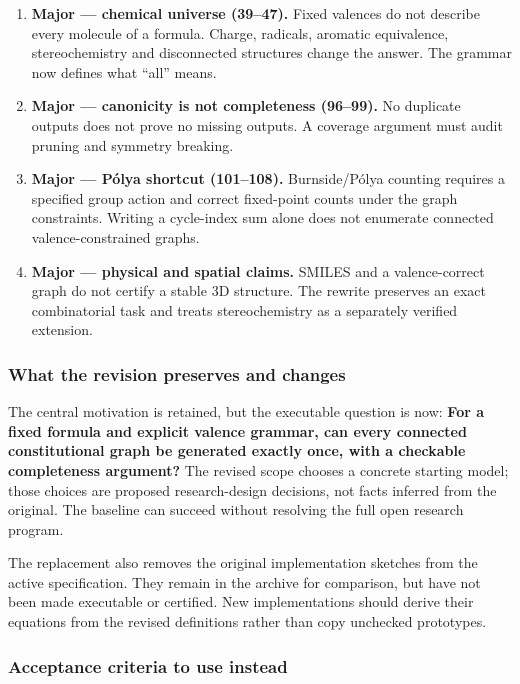 \documentclass[
  11pt,
]{article}
\begin{document}
\begin{enumerate}
\def\labelenumi{\arabic{enumi}.}
\item
  \textbf{Major --- chemical universe (39--47).} Fixed valences do not
  describe every molecule of a formula. Charge, radicals, aromatic
  equivalence, stereochemistry and disconnected structures change the
  answer. The grammar now defines what ``all'' means.
\item
  \textbf{Major --- canonicity is not completeness (96--99).} No
  duplicate outputs does not prove no missing outputs. A coverage
  argument must audit pruning and symmetry breaking.
\item
  \textbf{Major --- Pólya shortcut (101--108).} Burnside/Pólya counting
  requires a specified group action and correct fixed-point counts under
  the graph constraints. Writing a cycle-index sum alone does not
  enumerate connected valence-constrained graphs.
\item
  \textbf{Major --- physical and spatial claims.} SMILES and a
  valence-correct graph do not certify a stable 3D structure. The
  rewrite preserves an exact combinatorial task and treats
  stereochemistry as a separately verified extension.
\end{enumerate}

\subsubsection{What the revision preserves and changes}

The central motivation is retained, but the executable question is now:
\textbf{For a fixed formula and explicit valence grammar, can every
connected constitutional graph be generated exactly once, with a
checkable completeness argument?} The revised scope chooses a concrete
starting model; those choices are proposed research-design decisions,
not facts inferred from the original. The baseline can succeed without
resolving the full open research program.

The replacement also removes the original implementation sketches from
the active specification. They remain in the archive for comparison, but
have not been made executable or certified. New implementations should
derive their equations from the revised definitions rather than copy
unchecked prototypes.

\subsubsection{Acceptance criteria to use instead}
\end{document}

